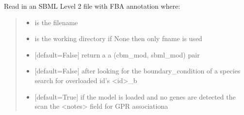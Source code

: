 \documentclass[letterpaper,12pt,english]{sphinxmanual}
\begin{document}
\begin{fulllineitems}

\pysigstartsignatures
\pysiglinewithargsret
{}
{\sphinxparamcomma {}\sphinxparamcomma {}\sphinxparamcomma {}\sphinxparamcomma {}}
{}
\pysigstopsignatures
\sphinxAtStartPar
Read in an SBML Level 2 file with FBA annotation where:
\begin{quote}\begin{description}
\begin{itemize}
\item {} 
\sphinxAtStartPar
{} \textendash{} is the filename

\item {} 
\sphinxAtStartPar
{} \textendash{} is the working directory if None then only fname is used

\item {} 
\sphinxAtStartPar
{} \textendash{} {[}default=False{]} return a a (cbm\_mod, sbml\_mod) pair

\item {} 
\sphinxAtStartPar
{} \textendash{} {[}default=False{]} after looking for the boundary\_condition of a species search for overloaded id’s \textless{}id\textgreater{}\_b

\item {} 
\sphinxAtStartPar
{} \textendash{} {[}default=True{]} if the model is loaded and no genes are detected the scan the \textless{}notes\textgreater{} field for GPR associationa

\end{itemize}

\end{description}\end{quote}

\end{fulllineitems}
\end{document}
